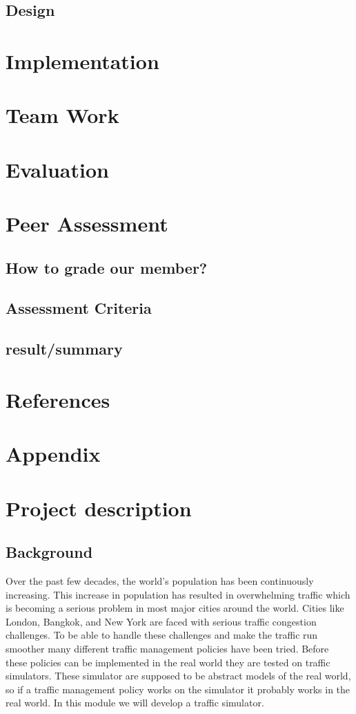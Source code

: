 \documentclass[11pt]{article}
\begin{document}
	\subsection{Design} 
\section{Implementation}
\section{Team Work}
\section{Evaluation}
\section{Peer Assessment}
	\subsection{How to grade our member?}
	\subsection{Assessment Criteria}
	\subsection{result/summary}
\section{References}
\section{Appendix}


\section{Project description}


\subsection{Background}
Over the past few decades, the world's population has been continuously increasing. This increase in population has resulted in overwhelming traffic which is becoming a serious problem in most major cities around the world. Cities like London, Bangkok, and New York are faced with serious traffic congestion challenges. To be able to handle these challenges and make the traffic run smoother many different traffic management policies have been tried. Before these policies can be implemented in the real world they are tested on traffic simulators. These simulator are supposed to be abstract models of the real world, so if a traffic management policy works on the simulator it probably works in the real world. In this module we will develop a traffic simulator.
\end{document}
